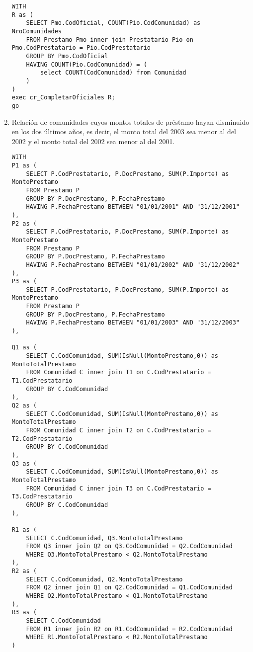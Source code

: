 \begin{enumerate}
\begin{verbatim}
WITH
R as (
    SELECT Pmo.CodOficial, COUNT(Pio.CodComunidad) as NroComunidades
    FROM Prestamo Pmo inner join Prestatario Pio on Pmo.CodPrestatario = Pio.CodPrestatario
    GROUP BY Pmo.CodOficial
    HAVING COUNT(Pio.CodComunidad) = (
        select COUNT(CodComunidad) from Comunidad
    )
)
exec cr_CompletarOficiales R;
go
\end{verbatim}


\item Relación de comunidades cuyos montos totales de préstamo hayan disminuido
en los dos últimos años, es decir, el monto total del 2003 sea menor al del
2002 y el monto total del 2002 sea menor al del 2001.

\begin{verbatim}
WITH
P1 as (
    SELECT P.CodPrestatario, P.DocPrestamo, SUM(P.Importe) as MontoPrestamo
    FROM Prestamo P
    GROUP BY P.DocPrestamo, P.FechaPrestamo
    HAVING P.FechaPrestamo BETWEEN "01/01/2001" AND "31/12/2001"
),
P2 as (
    SELECT P.CodPrestatario, P.DocPrestamo, SUM(P.Importe) as MontoPrestamo
    FROM Prestamo P
    GROUP BY P.DocPrestamo, P.FechaPrestamo
    HAVING P.FechaPrestamo BETWEEN "01/01/2002" AND "31/12/2002"
),
P3 as (
    SELECT P.CodPrestatario, P.DocPrestamo, SUM(P.Importe) as MontoPrestamo
    FROM Prestamo P
    GROUP BY P.DocPrestamo, P.FechaPrestamo
    HAVING P.FechaPrestamo BETWEEN "01/01/2003" AND "31/12/2003"
),

Q1 as (
    SELECT C.CodComunidad, SUM(IsNull(MontoPrestamo,0)) as MontoTotalPrestamo
    FROM Comunidad C inner join T1 on C.CodPrestatario = T1.CodPrestatario
    GROUP BY C.CodComunidad
),
Q2 as (
    SELECT C.CodComunidad, SUM(IsNull(MontoPrestamo,0)) as MontoTotalPrestamo
    FROM Comunidad C inner join T2 on C.CodPrestatario = T2.CodPrestatario
    GROUP BY C.CodComunidad
),
Q3 as (
    SELECT C.CodComunidad, SUM(IsNull(MontoPrestamo,0)) as MontoTotalPrestamo
    FROM Comunidad C inner join T3 on C.CodPrestatario = T3.CodPrestatario
    GROUP BY C.CodComunidad
),

R1 as (
    SELECT C.CodComunidad, Q3.MontoTotalPrestamo
    FROM Q3 inner join Q2 on Q3.CodComunidad = Q2.CodComunidad
    WHERE Q3.MontoTotalPrestamo < Q2.MontoTotalPrestamo
),
R2 as (
    SELECT C.CodComunidad, Q2.MontoTotalPrestamo
    FROM Q2 inner join Q1 on Q2.CodComunidad = Q1.CodComunidad
    WHERE Q2.MontoTotalPrestamo < Q1.MontoTotalPrestamo
),
R3 as (
    SELECT C.CodComunidad
    FROM R1 inner join R2 on R1.CodComunidad = R2.CodComunidad
    WHERE R1.MontoTotalPrestamo < R2.MontoTotalPrestamo
)


\end{verbatim}
\end{enumerate}
